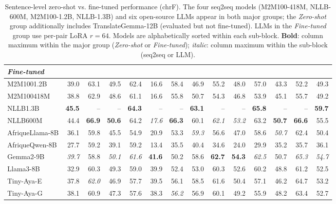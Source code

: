 \begin{table}[t]
\begin{tabular}{lrrrrrrrrrrrrr}
\midrule\midrule
\multicolumn{14}{l}{\textit{Fine-tuned}} \\
\midrule
M2M100\textunderscore{}1.2B & 39.0 & 63.1 & 49.5 & 62.4 & 16.6 & 58.4 & 46.9 & 55.2 & 48.0 & 57.0 & 43.3 & 52.2 & 49.3 \\
M2M100\textunderscore{}418M & 38.8 & 62.9 & 48.6 & 61.1 & 16.6 & 55.8 & 50.7 & 54.3 & 46.8 & 53.9 & 45.1 & 55.7 & 49.2 \\
NLLB\textunderscore{}1.3B & \textbf{45.5} & -- & -- & \textbf{64.3} & -- & -- & \textbf{63.1} & -- & -- & \textbf{65.8} & -- & -- & \textbf{59.7} \\
NLLB\textunderscore{}600M & 44.4 & \textbf{66.9} & \textbf{50.6} & 64.2 & \emph{17.6} & \textbf{66.3} & 60.1 & \emph{62.1} & \emph{53.2} & 63.2 & \textbf{50.7} & \textbf{66.6} & 55.5 \\
\midrule
AfriqueLlama-8B & 36.1 & 59.8 & 45.5 & 54.9 & 20.9 & 53.3 & \emph{59.3} & 56.6 & 47.0 & 58.6 & \emph{50.7} & 62.4 & 50.4 \\
AfriqueQwen-8B & 27.7 & 59.2 & 39.1 & 59.2 & 13.4 & 35.5 & 40.4 & 34.6 & 24.0 & 29.9 & 35.2 & 35.7 & 36.1 \\
Gemma2-9B & \emph{39.7} & 58.8 & \emph{50.1} & \emph{61.6} & \textbf{41.6} & 50.2 & 58.6 & \textbf{62.7} & \textbf{54.3} & \emph{62.5} & 50.7 & \emph{65.3} & \emph{54.7} \\
Llama3-8B & 32.9 & 60.3 & 49.3 & 59.0 & 39.9 & 52.4 & 53.0 & 60.3 & 52.6 & 60.2 & 48.8 & 61.2 & 52.5 \\
Tiny-Aya-E & 37.8 & \emph{62.0} & 46.9 & 57.7 & 39.5 & 56.1 & 58.5 & 61.6 & 50.4 & 57.1 & 46.2 & 64.7 & 53.2 \\
Tiny-Aya-G & 38.1 & 60.9 & 47.3 & 57.6 & 38.3 & \emph{56.2} & 56.9 & 60.1 & 49.2 & 55.9 & 48.2 & 63.4 & 52.7 \\
\bottomrule
\end{tabular}
\caption{Sentence-level zero-shot vs. fine-tuned performance (chrF). The four seq2seq models (M2M100-418M, NLLB-600M, M2M100-1.2B, NLLB-1.3B) and six open-source LLMs appear in both major groups; the \textit{Zero-shot} group additionally includes TranslateGemma-12B (evaluated but not fine-tuned). LLMs in the \textit{Fine-tuned} group use per-pair LoRA $r{=}64$. Models are alphabetically sorted within each sub-block. \textbf{Bold}: column maximum within the major group (\textit{Zero-shot} or \textit{Fine-tuned}); \emph{italic}: column maximum within the sub-block (seq2seq or LLM).}
\label{tab:main_zs_ft_chrf}
\end{table}
